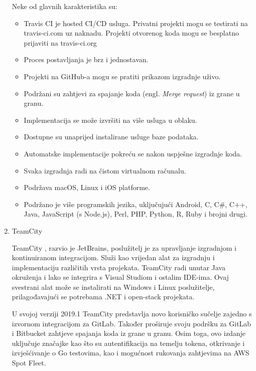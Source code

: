 \documentclass[a4paper,12pt,oneside]{article}
\begin{document}
\begin{enumerate}
Neke od glavnih karakteristika su:
\begin{itemize}
\item Travis CI je hosted CI/CD usluga. Privatni projekti mogu se testirati na travis-ci.com uz naknadu. Projekti otvorenog koda mogu se besplatno prijaviti na travis-ci.org
\item Proces postavljanja je brz i jednostavan.
\item Projekti na GitHub-a mogu se pratiti prikazom izgradnje uživo.
\item Podržani su zahtjevi za spajanje koda (engl. \textit{Merge request}) iz grane u granu.
\item Implementacija se može izvršiti na više usluga u oblaku.
\item Dostupne su unaprijed instalirane usluge baze podataka.
\item Automatske implementacije pokreću se nakon uspješne izgradnje koda.
\item Svaka izgradnja radi na čistom virtualnom računalu.
\item Podržava macOS, Linux i iOS platforme.
\item Podržano je više programskih jezika, uključujući Android, C, C\#, C++, Java, JavaScript (s Node.js), Perl, PHP, Python, R, Ruby i brojni drugi.
\end{itemize}

\item 
TeamCity 

TeamCity \cite{teamCity}, razvio je JetBrains, poslužitelj je za upravljanje izgradnjom i kontinuiranom integracijom. Služi kao vrijedan alat za izgradnju i implementaciju različitih vrsta projekata. TeamCity radi unutar Java okruženja i lako se integrira s Visual Studiom i ostalim IDE-ima. Ovaj svestrani alat može se instalirati na Windows i Linux poslužitelje, prilagođavajući se potrebama .NET i open-stack projekata.

U svojoj verziji 2019.1 TeamCity predstavlja novo korisničko sučelje zajedno s izvornom integracijom za GitLab. Također proširuje svoju podršku za GitLab i Bitbucket zahtjeve spajanja koda iz grane u granu. Osim toga, ovo izdanje uključuje značajke kao što su autentifikacija na temelju tokena, otkrivanje i izvješćivanje o Go testovima, kao i mogućnost rukovanja zahtjevima na AWS Spot Fleet.


\end{enumerate}
\end{document}
